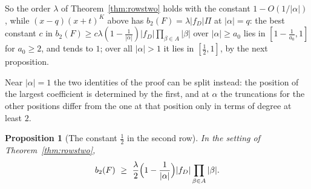 \documentclass[11pt]{article}
\newtheorem{proposition}[theorem]{Proposition}
\begin{document}
So the order $\lambda$ of Theorem~\ref{thm:rowstwo} holds with the constant
$1-O(1/|\alpha|)$, while $(x-q)(x+t)^K$ above has $b_2(F)=\lambda|f_D|\Pi$
at $|\alpha|=q$: the best constant $c$ in
$b_2(F)\ge c\lambda(1-\frac1{|\alpha|})|f_D|\prod_{\beta\in A}|\beta|$ over
$|\alpha|\ge a_0$ lies in $[1-\frac1{a_0},1]$ for $a_0\ge2$, and tends to
$1$; over all $|\alpha|>1$ it lies in $[\frac12,1]$, by the next
proposition.

Near $|\alpha|=1$ the two identities of the proof can be split instead:
the position of the largest coefficient is determined by the first, and at
$\alpha$ the truncations for the other positions differ from the one at
that position only in terms of degree at least $2$.

\begin{proposition}[The constant $\frac12$ in the second row]\label{prop:rowstwohalf}
In the setting of Theorem~\ref{thm:rowstwo},
\[
  b_2(F)\ \ge\ \frac\lambda2\Bigl(1-\frac1{|\alpha|}\Bigr)|f_D|\prod_{\beta\in A}|\beta| .
\]
\end{proposition}
\end{document}
